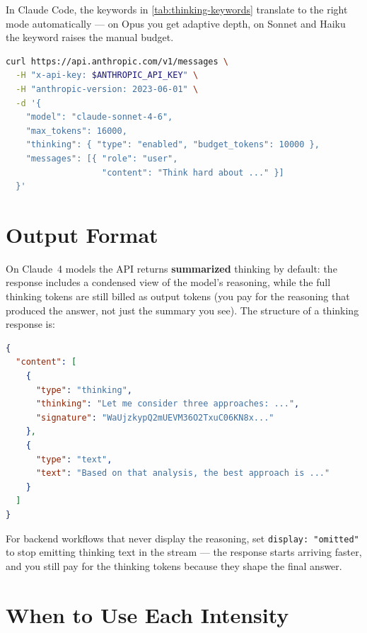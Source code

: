 In Claude Code, the keywords in \cref{tab:thinking-keywords} translate to
the right mode automatically — on Opus you get adaptive depth, on Sonnet and
Haiku the keyword raises the manual budget.

\begin{lstlisting}[language=bash,caption={Equivalent API call for Sonnet 4.6}]
curl https://api.anthropic.com/v1/messages \
  -H "x-api-key: $ANTHROPIC_API_KEY" \
  -H "anthropic-version: 2023-06-01" \
  -d '{
    "model": "claude-sonnet-4-6",
    "max_tokens": 16000,
    "thinking": { "type": "enabled", "budget_tokens": 10000 },
    "messages": [{ "role": "user",
                   "content": "Think hard about ..." }]
  }'
\end{lstlisting}

\section{Output Format}
\label{sec:thinking-output}


On Claude~4 models the API returns \textbf{summarized} thinking by default:
the response includes a condensed view of the model's reasoning, while
the full thinking tokens are still billed as output tokens (you pay for
the reasoning that produced the answer, not just the summary you see).
The structure of a thinking response is:

\begin{lstlisting}[language=json,caption={Response structure with extended thinking}]
{
  "content": [
    {
      "type": "thinking",
      "thinking": "Let me consider three approaches: ...",
      "signature": "WaUjzkypQ2mUEVM36O2TxuC06KN8x..."
    },
    {
      "type": "text",
      "text": "Based on that analysis, the best approach is ..."
    }
  ]
}
\end{lstlisting}

For backend workflows that never display the reasoning, set
\texttt{display: "omitted"} to stop emitting thinking text in the stream —
the response starts arriving faster, and you still pay for the thinking
tokens because they shape the final answer.

\section{When to Use Each Intensity}
\label{sec:thinking-when}


